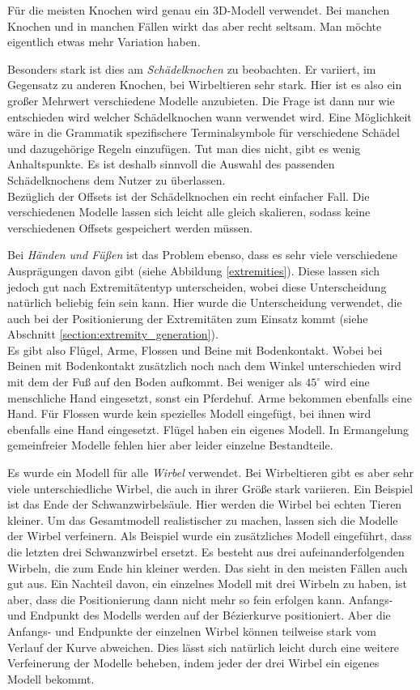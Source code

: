 Für die meisten Knochen wird genau ein 3D-Modell verwendet. Bei manchen Knochen und in manchen Fällen wirkt das aber recht seltsam. Man möchte eigentlich etwas mehr Variation haben.

Besonders stark ist dies am \emph{Schädelknochen} zu beobachten. Er variiert, im Gegensatz zu anderen Knochen, bei Wirbeltieren sehr stark. Hier ist es also ein großer Mehrwert verschiedene Modelle anzubieten. Die Frage ist dann nur wie entschieden wird welcher Schädelknochen wann verwendet wird. Eine Möglichkeit wäre in die Grammatik spezifischere Terminalsymbole für verschiedene Schädel und dazugehörige Regeln einzufügen. Tut man dies nicht, gibt es wenig Anhaltspunkte. Es ist deshalb sinnvoll die Auswahl des passenden Schädelknochens dem Nutzer zu überlassen.\\
Bezüglich der Offsets ist der Schädelknochen ein recht einfacher Fall. Die verschiedenen Modelle lassen sich leicht alle gleich skalieren, sodass keine verschiedenen Offsets gespeichert werden müssen.

Bei \emph{Händen und Füßen} ist das Problem ebenso, dass es sehr viele verschiedene Ausprägungen davon gibt (siehe \zb Abbildung \ref{extremities}). Diese lassen sich jedoch gut nach Extremitätentyp unterscheiden, wobei diese Unterscheidung natürlich beliebig fein sein kann. 
Hier wurde die Unterscheidung verwendet, die auch bei der Positionierung der Extremitäten zum Einsatz kommt (siehe Abschnitt \ref{section:extremity_generation}). \\
Es gibt also Flügel, Arme, Flossen und Beine mit Bodenkontakt. Wobei bei Beinen mit Bodenkontakt zusätzlich noch nach dem Winkel unterschieden wird mit dem der Fuß auf den Boden aufkommt. Bei weniger als $45^\circ$ wird eine menschliche Hand eingesetzt, sonst ein Pferdehuf. Arme bekommen ebenfalls eine Hand. Für Flossen wurde kein spezielles Modell eingefügt, bei ihnen wird ebenfalls eine Hand eingesetzt. Flügel haben ein eigenes Modell. In Ermangelung gemeinfreier Modelle fehlen hier aber leider einzelne Bestandteile.

Es wurde ein Modell für alle \emph{Wirbel} verwendet. Bei Wirbeltieren gibt es aber sehr viele unterschiedliche Wirbel, die auch in ihrer Größe stark variieren. Ein Beispiel ist das Ende der Schwanzwirbelsäule. Hier werden die Wirbel bei echten Tieren kleiner.
Um das Gesamtmodell realistischer zu machen, lassen sich die Modelle der Wirbel verfeinern. Als Beispiel wurde ein zusätzliches Modell eingeführt, dass die letzten drei Schwanzwirbel ersetzt. Es besteht aus drei aufeinanderfolgenden Wirbeln, die zum Ende hin kleiner werden. Das sieht in den meisten Fällen auch gut aus. Ein Nachteil davon, ein einzelnes Modell mit drei Wirbeln zu haben, ist aber, dass die Positionierung dann nicht mehr so fein erfolgen kann. Anfangs- und Endpunkt des Modells werden auf der Bézierkurve positioniert. Aber die Anfangs- und Endpunkte der einzelnen Wirbel können teilweise stark vom Verlauf der Kurve abweichen.
Dies lässt sich natürlich leicht durch eine weitere Verfeinerung der Modelle beheben, indem jeder der drei Wirbel ein eigenes Modell bekommt.

